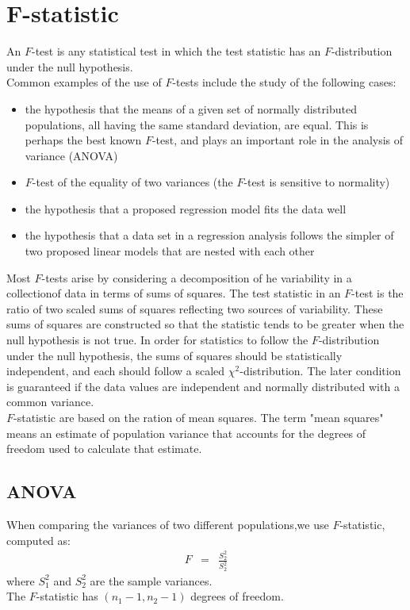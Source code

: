 \section{F-statistic}
An $F$-test is any statistical test in which the test statistic has an $F$-distribution under the null hypothesis.\\
Common examples of the use of $F$-tests include the study of the following cases:
\begin{itemize}
	\item the hypothesis that the means of a given set of normally distributed populations, all having the same standard deviation, are equal. This is perhaps the best known $F$-test, and plays an important role in the analysis of variance (ANOVA)
	\item $F$-test of the equality of two variances (the $F$-test is sensitive to normality)
	\item the hypothesis that a proposed regression model fits the data well
	\item the hypothesis that a data set in a regression analysis follows the simpler of two proposed linear models that are nested with each other
\end{itemize}
Most $F$-tests arise by considering a decomposition of he variability in a collectionof data in terms of sums of squares. The test statistic in an $F$-test is the ratio of two scaled sums of squares reflecting two sources of variability. These sums of squares are constructed so that the statistic tends to be greater when the null hypothesis is not true. In order for statistics to follow the $F$-distribution under the null hypothesis, the sums of squares should be statistically independent, and each should follow a scaled $\chi^{2}$-distribution. The later condition is guaranteed if the data values are independent and normally distributed with a common variance.\\
$F$-statistic are based on the ration of mean squares. The term "mean squares" means an estimate of population variance that accounts for the degrees of freedom used to calculate that estimate.\\

\subsection{ANOVA}
When comparing the variances of two different populations,we use $F$-statistic, computed as:
\begin{eqnarray}
	F &=& \frac{S_{2}^{2}}{S_{2}^{2}}
\end{eqnarray}
where $S_{1}^{2}$ and $S_{2}^{2}$ are the sample variances.\\
The $F$-statistic has $(n_{1} - 1, n_{2} - 1)$ degrees of freedom.


